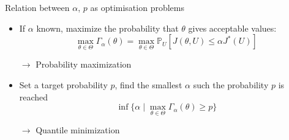 \documentclass[10pt,aspectratio=169,usepdftitle=false]{beamer}
\newcommand{\Kspace}{\Theta}
\newcommand{\Prob}{\mathbb{P}}
\DeclareMathOperator*{\argmax}{arg\,max}
\newcommand{\kk}{\theta}
\newcommand{\UU}{U}
\begin{document}
\begin{frame}{Relation between $\alpha$, $p$ as optimisation problems}

  \begin{itemize}
 \item If $\alpha$ known, \alert<1>{maximize the probability that $\kk$ gives
    acceptable values}:
    \begin{equation}
      \max_{\kk\in\Kspace} \Gamma_{\alpha}(\kk) = \max_{\kk\in\Kspace}\Prob_{\UU}\left[J(\kk, \UU) \leq \alpha J^*(\UU)\right]
    \end{equation}

    $\rightarrow$ Probability maximization
  \item Set a target probability $p$, \alert<2>{find the smallest $\alpha$ such the probability $p$ is reached}
    \begin{equation}
      \inf\{ \alpha \mid \max_{\kk\in\Kspace}\Gamma_{\alpha}(\kk) \geq p \}
    \end{equation}
    
  $\rightarrow$ Quantile minimization
  \end{itemize}
\end{frame}
\end{document}
